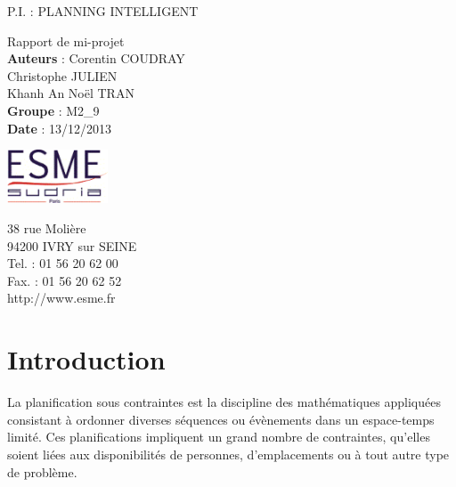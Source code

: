 \documentclass[12pt,a4paper,french]{article}
\begin{document}
\begin{titlepage}
	\begin{center}
		\begin{spacing}{2}
		{ \Huge{ P.I. : PLANNING INTELLIGENT}}\\[1cm]
		\end{spacing}
		{ \Large{Rapport de mi-projet}}\\[10cm]
		
		\textbf{Auteurs} : 
			Corentin COUDRAY \\
			Christophe JULIEN \\
			Khanh An Noël TRAN \\ 
		\textbf{Groupe} : M2\_9\\
		\textbf{Date} : 13/12/2013\\[2 cm]
	\end{center}	
	\vfill 
	\begin{minipage}[b]{0.3\linewidth}
		\includegraphics[width=30mm]{logo.png}
	\end{minipage}
	\hfill
	\begin{minipage}[b]{0.3\linewidth}
		{\footnotesize{38 rue Molière}}\\
		{\footnotesize{94200 IVRY sur SEINE}}\\
		{\footnotesize{Tel. : 01 56 20 62 00}}\\
		{\footnotesize{Fax. : 01 56 20 62 52}}\\
		{\footnotesize{http://www.esme.fr}}
	\end{minipage}
\end{titlepage}


\renewcommand{\contentsname}{Sommaire}
\tableofcontents
\newpage

\section{Introduction}

La planification sous contraintes est la discipline des mathématiques appliquées consistant à ordonner diverses séquences ou évènements dans un espace-temps limité. Ces planifications impliquent un grand nombre de contraintes, qu'elles soient liées aux disponibilités de personnes, d'emplacements ou à tout autre type de problème.\\
\end{document}
